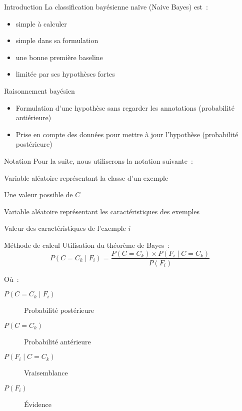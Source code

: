 \begin{frame}{Introduction}
  La classification bayésienne naïve (Naive Bayes) est~:
  \begin{itemize}[<+(1)->]
    \item simple à calculer
    \item simple dans sa formulation
    \item une bonne première baseline
    \item limitée par ses hypothèses fortes
  \end{itemize}
\end{frame}

\begin{frame}{Raisonnement bayésien}
  \begin{itemize}
    \item Formulation d'une hypothèse sans regarder les annotations (probabilité antiérieure)
    \item Prise en compte des données pour mettre à jour l'hypothèse (probabilité postérieure)
  \end{itemize}
\end{frame}

\begin{frame}{Notation}
  Pour la suite, nous utiliserons la notation suivante~:

  \begin{description}[<+->]
    \item[$C$] Variable aléatoire représentant la classe d'un exemple
    \item[$C_k$] Une valeur possible de $C$
    \item[$F$] Variable aléatoire représentant les caractéristiques des exemples
    \item[$F_i$] Valeur des caractéristiques de l'exemple $i$
  \end{description}
\end{frame}

\begin{frame}{Méthode de calcul}
  Utilisation du théorème de Bayes~:
  \[
    P(C = C_k \mid F_i) = \frac{P(C = C_k) \times P(F_i \mid C = C_k)}{P(F_i)}
  \]

  Où~:

  \begin{description}
    \item[$P(C = C_k \mid F_i)$] Probabilité postérieure
    \item[$P(C = C_k)$] Probabilité antérieure
    \item[$P(F_i \mid C = C_k)$] Vraisemblance
    \item[$P(F_i)$] Évidence
  \end{description}
\end{frame}

